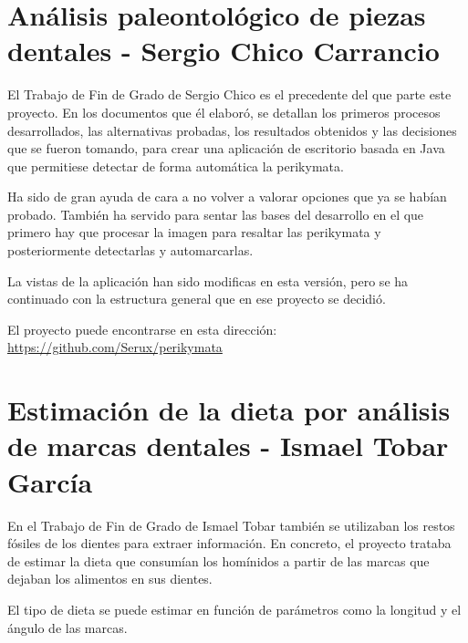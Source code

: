 \label{TrabajosRelacionados}
\begin{comment}
Este apartado sería parecido a un estado del arte de una tesis o tesina. En un trabajo final grado no parece obligada su presencia, aunque se puede dejar a juicio del tutor el incluir un pequeño resumen comentado de los trabajos y proyectos ya realizados en el campo del proyecto en curso. 
\end{comment}

\section{Análisis paleontológico de piezas dentales - Sergio Chico Carrancio}
\label{TFGsergio}
El Trabajo de Fin de Grado de Sergio Chico es el precedente del que parte este proyecto. En los documentos que él elaboró, se detallan los primeros procesos desarrollados, las alternativas probadas, los resultados obtenidos y las decisiones que se fueron tomando, para crear una aplicación de escritorio basada en Java que permitiese detectar de forma automática la perikymata.

Ha sido de gran ayuda de cara a no volver a valorar opciones que ya se habían probado. También ha servido para sentar las bases del desarrollo en el que primero hay que procesar la imagen para resaltar las perikymata y posteriormente detectarlas y automarcarlas.

La vistas de la aplicación han sido modificas en esta versión, pero se ha continuado con la estructura general que en ese proyecto se decidió.

El proyecto puede encontrarse en esta dirección:\\ \url{https://github.com/Serux/perikymata}

\section{Estimación de la dieta por análisis de marcas dentales - Ismael Tobar García}
\label{TFGisma}

En el Trabajo de Fin de Grado de Ismael Tobar también se utilizaban los restos fósiles de los dientes para extraer información. En concreto, el proyecto trataba de estimar la dieta que consumían los homínidos a partir de las marcas que dejaban los alimentos en sus dientes. 

El tipo de dieta se puede estimar en función de parámetros como la longitud y el ángulo de las marcas.

